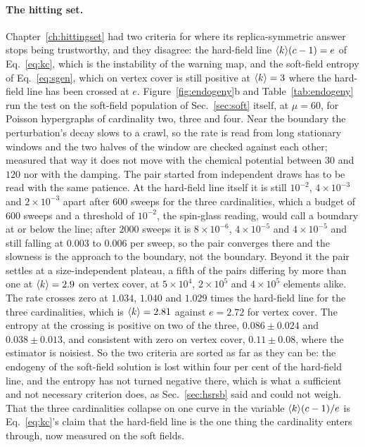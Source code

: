 \paragraph{The hitting set.} Chapter~\ref{ch:hittingset} had two criteria
for where its replica-symmetric answer stops being trustworthy, and they
disagree: the hard-field line $\langle k \rangle(c-1)=e$ of Eq.~\eqref{eq:kc}, which
is the instability of the warning map, and the soft-field entropy of
Eq.~\eqref{eq:sgen}, which on vertex cover is still positive at
$\langle k \rangle=3$ where the hard-field line has been crossed at $e$.
Figure~\ref{fig:endogeny}b and Table~\ref{tab:endogeny} run the test on
the soft-field population of Sec.~\ref{sec:soft} itself, at $\mu=60$, for
Poisson hypergraphs of cardinality two, three and four. Near
the boundary the perturbation's decay slows to a crawl, so the rate is
read from long stationary windows and the two halves of the window are
checked against each other; measured that way it does not move with the
chemical potential between $30$ and $120$ nor with the damping. The pair
started from independent draws has to be read with the same patience. At
the hard-field line itself it is still $10^{-2}$, $4\times10^{-3}$ and
$2\times10^{-3}$ apart after $600$ sweeps for the three cardinalities,
which a budget of $600$ sweeps and a threshold of $10^{-2}$, the
spin-glass reading, would call a boundary at or below the line; after
$2000$ sweeps it is $8\times10^{-6}$, $4\times10^{-5}$ and
$4\times10^{-5}$ and still falling at $0.003$ to $0.006$ per sweep, so
the pair converges there and the slowness is the approach to the
boundary, not the boundary. Beyond it the pair settles at a
size-independent plateau, a fifth of the pairs differing by more than
one at $\langle k \rangle=2.9$ on vertex cover, at $5\times10^{4}$, $2\times10^{5}$
and $4\times10^{5}$ elements alike. The rate crosses zero at $1.034$,
$1.040$ and $1.029$ times the hard-field line for the three
cardinalities, which is $\langle k \rangle=2.81$ against $e=2.72$ for vertex
cover. The entropy at the crossing is positive on two of the three,
$0.086\pm0.024$ and $0.038\pm0.013$, and consistent with zero on vertex
cover, $0.11\pm0.08$, where the estimator is noisiest. So the two criteria
are sorted as far as they can be: the endogeny of the soft-field solution
is lost within four per cent of the hard-field line, and the entropy has
not turned negative there, which is what a sufficient and not necessary
criterion does, as Sec.~\ref{sec:hsrsb} said and could not weigh. That the three cardinalities collapse on one curve in the
variable $\langle k \rangle(c-1)/e$ is Eq.~\eqref{eq:kc}'s claim that the
hard-field line is the one thing the cardinality enters through, now
measured on the soft fields.

